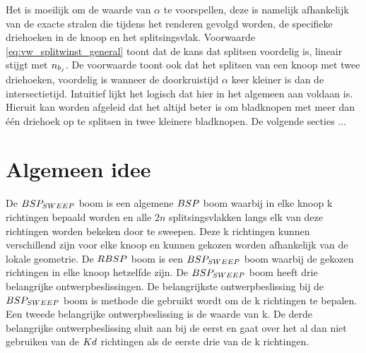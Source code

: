 Het is moeilijk om de waarde van $\alpha$ te voorspellen, deze is namelijk afhankelijk van de exacte stralen die tijdens het renderen gevolgd worden, de specifieke driehoeken in de knoop en het splitsingsvlak. Voorwaarde \ref{eq:vw_splitwinst_general} toont dat de kans dat splitsen voordelig is, lineair stijgt met $n_{b_j}$. De voorwaarde toont ook dat het splitsen van een knoop met twee driehoeken, voordelig is wanneer de doorkruistijd $\alpha$ keer kleiner is dan de intersectietijd. Intuitief lijkt het logisch dat hier in het algemeen aan voldaan is. Hieruit kan worden afgeleid dat het altijd beter is om bladknopen met meer dan één driehoek op te splitsen in twee kleinere bladknopen. De volgende secties ... \\



\section{Algemeen idee}
    De $BSP_{SWEEP}$ boom is een algemene $BSP$ boom waarbij in elke knoop k richtingen bepaald worden en alle $2n$ splitsingsvlakken langs elk van deze richtingen worden bekeken door te sweepen.
    Deze k richtingen kunnen verschillend zijn voor elke knoop en kunnen gekozen worden afhankelijk van de lokale geometrie.
    De $RBSP$ boom is een $BSP_{SWEEP}$ boom waarbij de gekozen richtingen in elke knoop hetzelfde zijn.
    De $BSP_{SWEEP}$ boom heeft drie belangrijke ontwerpbeslissingen.
    De belangrijkste ontwerpbeslissing bij de $BSP_{SWEEP}$ boom is methode die gebruikt wordt om de k richtingen te bepalen.
    Een tweede belangrijke ontwerpbeslissing is de waarde van k.
    De derde belangrijke ontwerpbeslissing sluit aan bij de eerst en gaat over het al dan niet gebruiken van de $Kd$ richtingen als de eerste drie van de k richtingen.
    \\


